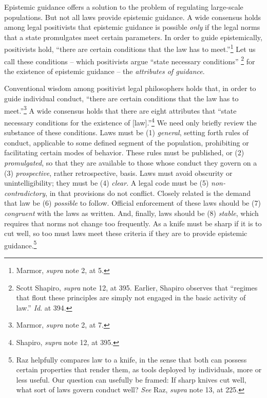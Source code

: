 Epistemic guidance offers a solution to the problem of regulating
large-scale populations. But not all laws provide epistemic guidance. A
wide consensus holds among legal positivists that epistemic guidance is
possible \emph{only} if the legal norms that a state promulgates meet
certain parameters. In order to guide epistemically, positivists hold,
``there are certain conditions that the law has to meet.''\footnote{Marmor,
  \emph{supra} note 2, at 5.} Let us call these conditions -- which
positivists argue ``state necessary conditions'' \footnote{Scott
  Shapiro, \emph{supra} note 12, at 395. Earlier, Shapiro observes that
  ``regimes that flout these principles are simply not engaged in the
  basic activity of law.'' \emph{Id}. at 394.} for the existence of
epistemic guidance -- the \emph{attributes of guidance}.

Conventional wisdom among positivist legal philosophers holds that, in
order to guide individual conduct, ``there are certain conditions that
the law has to meet.''\footnote{Marmor, \emph{supra} note 2, at 7.} A
wide consensus holds that there are eight attributes that ``state
necessary conditions for the existence of {[}law{]}.''\footnote{Shapiro,
  \emph{supra} note 12, at 395.} We need only briefly review the
substance of these conditions. Laws must be (1) \emph{general}, setting
forth rules of conduct, applicable to some defined segment of the
population, prohibiting or facilitating certain modes of behavior. These
rules must be published, or (2) \emph{promulgated}, so that they are
available to those whose conduct they govern on a (3)
\emph{prospective}, rather retrospective, basis. Laws must avoid
obscurity or unintelligibility; they must be (4) \emph{clear}. A legal
code must be (5) \emph{non-contradictory}, in that provisions do not
conflict. Closely related is the demand that law be (6) \emph{possible}
to follow. Official enforcement of these laws should be (7)
\emph{congruent} with the laws as written. And, finally, laws should be
(8) \emph{stable}, which requires that norms not change too frequently.
As a knife must be sharp if it is to cut well, so too must laws meet
these criteria if they are to provide epistemic guidance.\footnote{Raz
  helpfully compares law to a knife, in the sense that both can possess
  certain properties that render them, as tools deployed by individuals,
  more or less useful. Our question can usefully be framed: If sharp
  knives cut well, what sort of laws govern conduct well? \emph{See}
  Raz, \emph{supra} note 13, at 225.}


